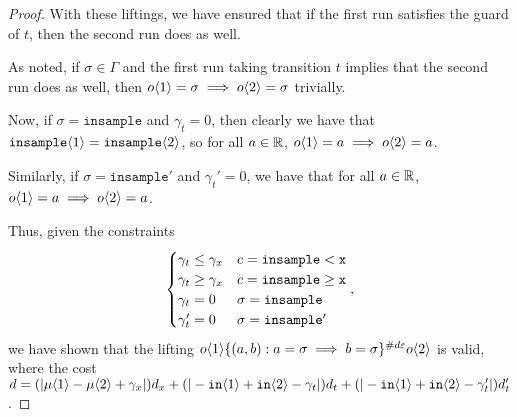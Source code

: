 \begin{proof}
With these liftings, we have ensured that if the first run satisfies the guard of $t$, then the second run does as well. 

As noted, if $\sigma \in \Gamma$ and the first run taking transition $t$ implies that the second run does as well, then $o\brangle{1} = \sigma \implies o\brangle{2}=\sigma$ trivially.

Now, if $\sigma=\texttt{insample}$ and $\gamma_t=0$, then clearly we have that $\texttt{insample}\brangle{1}=\texttt{insample}\brangle{2}$, so for all $a\in \RR$, $o\brangle{1} = a\implies o\brangle{2} = a$.

Similarly, if $\sigma=\texttt{insample}'$ and $\gamma_t'=0$, we have that for all $a\in \RR$, $o\brangle{1} = a\implies o\brangle{2} = a$.

Thus, given the constraints \[
  \begin{cases}
    \gamma_t\leq\gamma_x & c = \lguard[\texttt{x}]\\
    \gamma_t\geq\gamma_x & c = \gguard[\texttt{x}]\\
    \gamma_t=0 & \sigma = \texttt{insample}\\
    \gamma_t'=0 & \sigma = \texttt{insample}'
  \end{cases},
\]
we have shown that the lifting $o\brangle{1}\{(a, b): a=\sigma\implies b=\sigma\}^{\#d\varepsilon}o\brangle{2}$ is valid, where the cost $d = (|\mu\brangle{1}-\mu\brangle{2}+\gamma_x|)d_x+(|-\texttt{in}\brangle{1}+\texttt{in}\brangle{2}-\gamma_t|)d_t+(|-\texttt{in}\brangle{1}+\texttt{in}\brangle{2}-\gamma_t'|)d_t'$. 

\end{proof}


